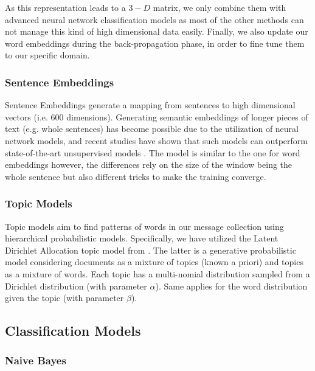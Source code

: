 \documentclass[letterpaper]{article}
\begin{document}
As this representation leads to a $3-D$ matrix, we only combine them with advanced neural network classification models as most of the other methods can not manage this kind of high dimensional data easily. Finally, we also update our word embeddings during the back-propagation phase, in order to fine tune them to our specific domain.

\subsubsection{Sentence Embeddings}  \label{Sentence Embeddings}

Sentence Embeddings generate a mapping from sentences to high dimensional vectors (i.e. $600$ dimensions). Generating semantic embeddings of longer pieces of text (e.g. whole sentences) has become possible due to the utilization of neural network models, and recent studies have shown that such models can outperform state-of-the-art unsupervised models \cite{pagliardini2017unsupervised}. The model is similar to the one for word embeddings however, the differences rely on the size of the window being the whole sentence but also different tricks to make the training converge.

\subsubsection{Topic Models}  \label{Topics}

Topic models aim to find patterns of words in our message collection using hierarchical probabilistic models. Specifically, we have utilized the Latent Dirichlet Allocation topic model from \cite{blei2006dynamic}. The latter is a generative probabilistic model considering documents as a mixture of topics (known a priori) and topics as a mixture of words. Each topic has a multi-nomial distribution sampled from a Dirichlet distribution (with parameter $\alpha$). Same applies for the word distribution given the topic (with parameter $\beta$).

\subsection{Classification Models}  \label{Classification}

\subsubsection{Naive Bayes}  \label{Naive Bayes}
\end{document}
